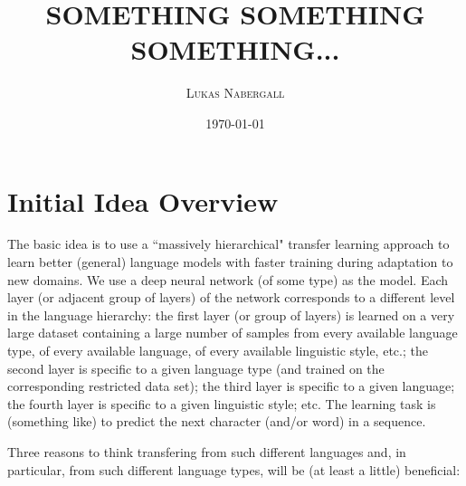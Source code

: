 \documentclass[12pt,letterpaper]{article}
\theoremstyle{remark}
\theoremstyle{plain}
\begin{document}
\title{\uppercase{\textbf{\normalsize Something something something...}}}

\author{\small{\textsc{Lukas Nabergall}}}
\date{\small{\textsc{\today}}}
\maketitle

\allowdisplaybreaks


\section{Initial Idea Overview}

The basic idea is to use a ``massively hierarchical" transfer learning approach to learn better (general) language models with faster training during adaptation to new domains. We use a deep neural network (of some type) as the model. Each layer (or adjacent group of layers) of the network corresponds to a different level in the language hierarchy: the first layer (or group of layers) is learned on a very large dataset containing a large number of samples from every available language type, of every available language, of every available linguistic style, etc.; the second layer is specific to a given language type (and trained on the corresponding restricted data set); the third layer is specific to a given language; the fourth layer is specific to a given linguistic style; etc. The learning task is (something like) to predict the next character (and/or word) in a sequence. 

Three reasons to think transfering from such different languages and, in particular, from such different language types, will be (at least a little) beneficial: 
\end{document}
